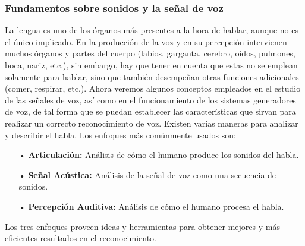 \subsubsection{Fundamentos sobre sonidos y la señal de voz}
La lengua es uno de los órganos más presentes a la hora de hablar, aunque no es el único implicado. En la producción de la voz y en su percepción intervienen muchos órganos y partes del cuerpo (labios, garganta, cerebro, oídos, pulmones, boca, nariz, etc.), sin embargo, hay que tener en cuenta que estas no se emplean solamente para hablar, sino que también desempeñan otras funciones adicionales (comer, respirar, etc.).
\vskip 0.5cm
Ahora veremos algunos conceptos empleados en el estudio de las señales de voz, así como en el funcionamiento de los sistemas generadores de voz, de tal forma que se puedan establecer las características que sirvan para realizar un correcto reconocimiento de voz. Existen varias maneras para analizar y describir el habla. Los enfoques más comúnmente usados son:
\begin{enumerate}
\item[•]\textbf{Articulación:} Análisis de cómo el humano produce los sonidos del habla.
\item[•]\textbf{Señal Acústica:} Análisis de la señal de voz como una secuencia de sonidos.
\item[•]\textbf{Percepción Auditiva:} Análisis de cómo el humano procesa el habla.
\end{enumerate}

\par
Los tres enfoques proveen ideas y herramientas para obtener mejores y más eficientes resultados en el reconocimiento.
\vskip 0.5cm

